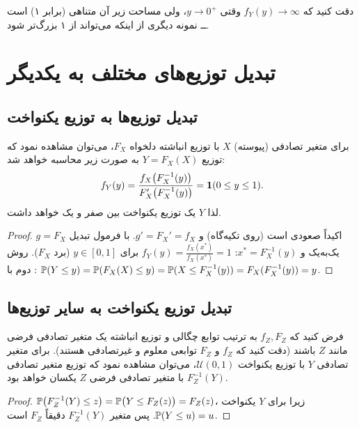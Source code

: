 \begin{note}
\notetitle دقت کنید که $f_Y(y)\to\infty$ وقتی $y\to0^+$، ولی مساحت زیر آن متناهی (برابر ۱) است ــ نمونه دیگری از اینکه  می‌تواند از ۱ بزرگ‌تر شود.
\end{note}

\section[تبدیل توزیع‌های مختلف به یکدیگر]{تبدیل توزیع‌های مختلف به یکدیگر {\large{}}}

\subsection{تبدیل توزیع‌ها به توزیع یکنواخت}
\begin{theorem}
برای متغیر تصادفی (پیوسته) $X$ با توزیع انباشته دلخواه $F_X$، می‌توان مشاهده نمود که توزیع $Y=F_X(X)$ به صورت زیر محاسبه خواهد شد:
\[
f_Y(y)=\frac{f_X\big(F_X^{-1}(y)\big)}{F_X'\big(F_X^{-1}(y)\big)}=\mathbf{1}(0\le y\le1).
\]
لذا $Y$ یک \textcolor{blue!60!black}{توزیع یکنواخت} بین صفر و یک خواهد داشت.
\end{theorem}
\begin{proof}
$g=F_X$ اکیداً صعودی است (روی تکیه‌گاه) و $g'=F_X'=f_X$. با فرمول تبدیل یک‌به‌یک و $x^*=F_X^{-1}(y)$: $f_Y(y)=\frac{f_X(x^*)}{f_X(x^*)}=1$ برای $y\in[0,1]$ (برد $F_X$). روش دوم با : $\mathbb{P}(Y\le y)=\mathbb{P}(F_X(X)\le y)=\mathbb{P}(X\le F_X^{-1}(y))=F_X(F_X^{-1}(y))=y$.
\end{proof}

\subsection{تبدیل توزیع یکنواخت به سایر توزیع‌ها}
\begin{theorem}
فرض کنید که $f_Z,F_Z$ به ترتیب توابع چگالی و توزیع انباشته یک متغیر تصادفی فرضی مانند $Z$ باشند (دقت کنید که $f_Z$ و $F_Z$ توابعی معلوم و غیرتصادفی هستند). برای متغیر تصادفی $Y$ با توزیع یکنواخت $\mathcal U(0,1)$، می‌توان مشاهده نمود که توزیع متغیر تصادفی $F_Z^{-1}(Y)$ با متغیر تصادفی فرضی $Z$ یکسان خواهد بود.
\end{theorem}
\begin{proof}
$\mathbb{P}\big(F_Z^{-1}(Y)\le z\big)=\mathbb{P}\big(Y\le F_Z(z)\big)=F_Z(z)$، زیرا برای $Y$ یکنواخت $\mathbb{P}(Y\le u)=u$. پس  متغیر $F_Z^{-1}(Y)$ دقیقاً $F_Z$ است.
\end{proof}

